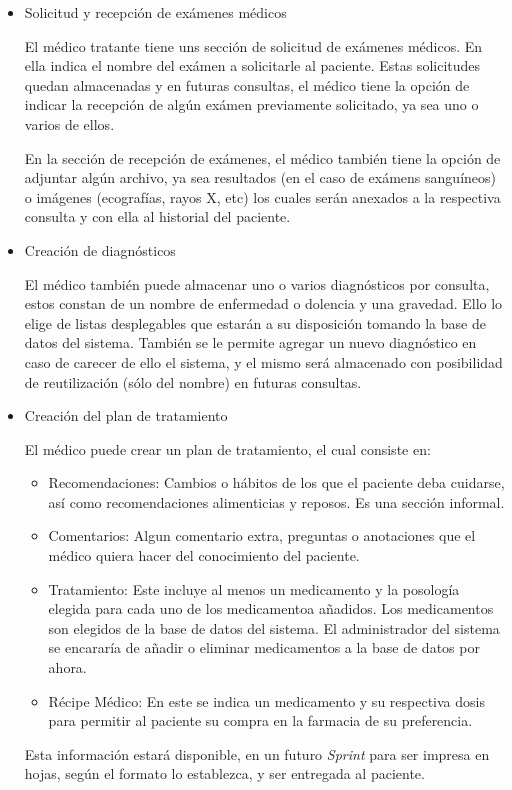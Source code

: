 \begin{enumerate}
\begin{itemize}
            \item Solicitud y recepción de exámenes médicos
            
            El médico  tratante tiene uns sección de solicitud de exámenes médicos. En ella indica el nombre del exámen a solicitarle al paciente. Estas solicitudes quedan almacenadas y en futuras consultas, el médico tiene la opción de indicar la recepción de algún exámen previamente solicitado, ya sea uno o varios de ellos.
            
            En la sección de recepción de exámenes, el médico también tiene la opción de adjuntar algún archivo, ya sea resultados (en el caso de exámens sanguíneos) o imágenes (ecografías, rayos X, etc) los cuales serán anexados a la respectiva consulta y con ella al historial del paciente.
            
            \item Creación de diagnósticos
            
            El médico también puede almacenar uno o varios diagnósticos por consulta, estos constan de un nombre de enfermedad o dolencia y una gravedad. Ello lo elige de listas desplegables que estarán a su disposición tomando la base de datos del sistema. También se le permite agregar un nuevo diagnóstico en caso de carecer de ello el sistema, y el mismo será almacenado con posibilidad de reutilización (sólo del nombre) en futuras consultas.
            
            \item Creación del plan de tratamiento
            
            El médico puede crear un plan de tratamiento, el cual consiste en:
            \begin{itemize}
                \item Recomendaciones: Cambios o hábitos de los que el paciente deba cuidarse, así como recomendaciones alimenticias y reposos. Es una sección informal.
                \item Comentarios: Algun comentario extra, preguntas o anotaciones que el médico quiera hacer del conocimiento del paciente.
                \item Tratamiento: Este incluye al menos un medicamento y la posología elegida para cada uno de los medicamentoa añadidos. Los medicamentos son elegidos de la base de datos del sistema. El administrador del sistema se encararía de añadir o eliminar medicamentos a la base de datos por ahora.
                \item Récipe Médico: En este se indica un medicamento y su respectiva dosis para permitir al paciente su compra en la farmacia de su preferencia.
            \end{itemize}
            
            Esta información estará disponible, en un futuro \textit{Sprint} para ser impresa en hojas, según el formato lo establezca, y ser entregada al paciente.
            
        \end{itemize}
    \end{enumerate}
        
